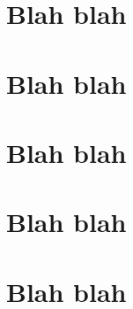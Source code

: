 \documentclass{article}
\begin{document}
    \section{Blah blah}
    \clearpage
    \section{Blah blah}
    \clearpage
    \section{Blah blah}
    \clearpage
    \section{Blah blah}
    \clearpage
    \section{Blah blah}
\end{document}
